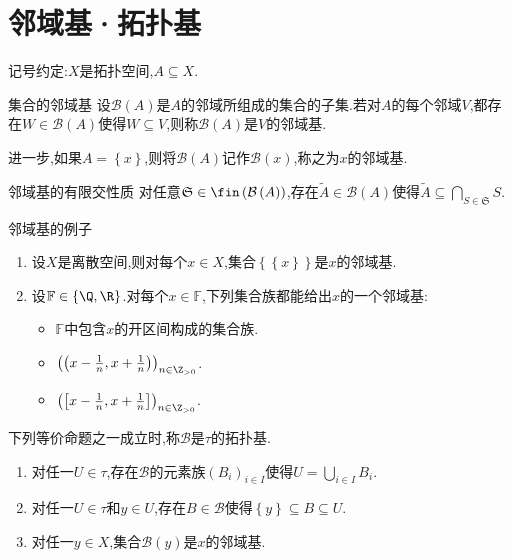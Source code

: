 \section{邻域基·拓扑基}

记号约定:$X$是拓扑空间,$A\subseteq X$.

\begin{definition}{集合的邻域基}{}
	设$\mathcal{B}\left(A\right)$是$A$的邻域所组成的集合的子集.若对$A$的每个邻域$V$,都存在$W\in\mathcal{B}\left(A\right)$使得$W\subseteq V$,则称$\mathcal{B}\left(A\right)$是$V$的邻域基.
	
	进一步,如果$A=\left\{x\right\}$,则将$\mathcal{B}\left(A\right)$记作$\mathcal{B}\left(x\right)$,称之为$x$的邻域基.
\end{definition}

\begin{proposition}{邻域基的有限交性质}{}
	对任意$\mathfrak{S}\in\fin\left(\mathcal{B}\left(A\right)\right)$,存在$\tilde{A}\in\mathcal{B}\left(A\right)$使得$\tilde{A}\subseteq\bigcap\limits_{S\in\mathfrak{S}}S$.
\end{proposition}

\begin{example}{邻域基的例子}{}
	\begin{enumerate}
		\item 设$X$是离散空间,则对每个$x\in X$,集合$\left\{\left\{x\right\}\right\}$是$x$的邻域基.
		\item 设$\mathbb{F}\in\left\{\Q,\R\right\}$.对每个$x\in\mathbb{F}$,下列集合族都能给出$x$的一个邻域基:
		\begin{itemize}
			\item $\mathbb{F}$中包含$x$的开区间构成的集合族.
			\item $\left(\left(x-\frac{1}{n},x+\frac{1}{n}\right)\right)_{n\in\Z_{>0}}$.
			\item $\left(\left[x-\frac{1}{n},x+\frac{1}{n}\right]\right)_{n\in\Z_{>0}}$.
		\end{itemize}
	\end{enumerate}
\end{example}

\begin{definition}{}{}
	下列等价命题之一成立时,称$\mathcal{B}$是$\tau$的拓扑基.
	\begin{enumerate}
		\item 对任一$U\in\tau$,存在$\mathcal{B}$的元素族$\left(B_{i}\right)_{i\in I}$使得$U=\bigcup\limits_{i\in I}B_{i}$.
		\item 对任一$U\in\tau$和$y\in U$,存在$B\in\mathcal{B}$使得$\left\{y\right\}\subseteq B\subseteq U$.
		\item 对任一$y\in X$,集合$\mathcal{B}\left(y\right)$是$x$的邻域基.
	\end{enumerate}
\end{definition}

